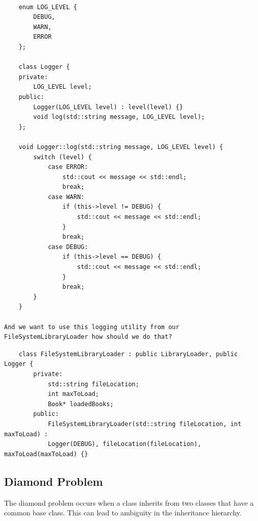\documentclass{report}
\begin{document}
\begin{verbatim}
	
	enum LOG_LEVEL {
		DEBUG,
		WARN,
		ERROR
	};
	
	class Logger {
	private:
		LOG_LEVEL level;
	public:
		Logger(LOG_LEVEL level) : level(level) {}
		void log(std::string message, LOG_LEVEL level);
	};
	
	void Logger::log(std::string message, LOG_LEVEL level) {
		switch (level) {
			case ERROR:
				std::cout << message << std::endl;
				break;
			case WARN:
				if (this->level != DEBUG) {
					std::cout << message << std::endl;
				}
				break;
			case DEBUG:
				if (this->level == DEBUG) {
					std::cout << message << std::endl;
				}
				break;
		}
	}

And we want to use this logging utility from our FileSystemLibraryLoader how should we do that?
\end{verbatim}

\begin{lstlisting}
	class FileSystemLibraryLoader : public LibraryLoader, public Logger {
		private:
			std::string fileLocation;
			int maxToLoad;
			Book* loadedBooks;
		public:
			FileSystemLibraryLoader(std::string fileLocation, int maxToLoad) :
			Logger(DEBUG), fileLocation(fileLocation), maxToLoad(maxToLoad) {}
\end{lstlisting}

\subsection{Diamond Problem}


The diamond problem occurs when a class inherits from two classes that have a common base class. This can lead to ambiguity in the inheritance hierarchy.

\begin{center}
\end{center}
\end{document}
